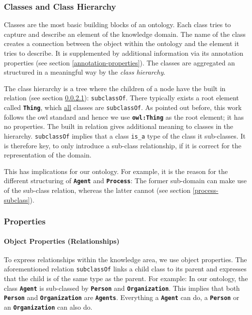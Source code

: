 \documentclass[a4paper, DIV=13, BCOR=0cm]{scrbook}
\newcommand{\class}[1]{\texttt{\textbf{#1}}}
\newcommand{\relation}[1]{\texttt{#1}}
\begin{document}
\subsubsection{Classes and Class Hierarchy }
\label{classes}
Classes are the most basic building blocks of an ontology. Each class tries to capture and describe an element of the knowledge domain. The name of the class creates a connection between the object within the ontology and the element it tries to describe. It is supplemented by additional information via its annotation properties (see section \ref{annotation-properties}). The classes are aggregated an structured in a meaningful way by the \textit{class hierarchy}.

The class hierarchy is a tree where the children of a node have the built in relation (see section \ref{relations}): \relation{subclassOf}. There typically exists a root element called \class{Thing}, which \underline{all} classes are \relation{subclassOf}. As pointed out before, this work follows the \gls{owl} standard and hence we use \class{owl:Thing} as the root element; it has no properties. The built in relation gives additional meaning to classes in the hierarchy. \relation{subclassOf} implies that a class \relation{is\_a} type of the class it sub-classes. It is therefore key, to only introduce a sub-class relationship, if it is correct for the representation of the domain.

This has implications for our ontology. For example, it is the reason for the different structuring of \class{Agent} and \class{Process}: The former sub-domain can make use of the sub-class relation, whereas the latter cannot (see section \ref{process-subclass}).

\subsubsection{Properties }

\paragraph{Object Properties (Relationships)}
\label{relations}
To express relationships within the knowledge area, we use object properties. The aforementioned relation \relation{subclassOf} links a child class to its parent and expresses that the child is of the same type as the parent. For example: In our ontology, the class \class{Agent} is sub-classed by \class{Person} and \class{Organization}. This implies that both \class{Person} and \class{Organization} are \class{Agents}. Everything a \class{Agent} can do, a \class{Person} or an \class{Organization} can also do.
\end{document}
